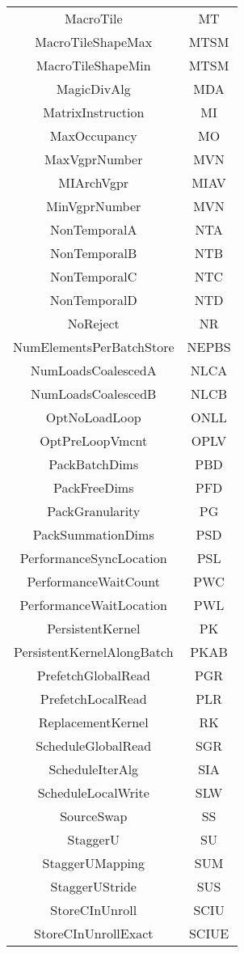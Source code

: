 \documentclass[]{article}
\begin{document}
\begin{center}
\begin{small}
\begin{longtable}{ |c|c| }
 MacroTile & MT \\
 MacroTileShapeMax & MTSM \\
 MacroTileShapeMin & MTSM \\
 MagicDivAlg & MDA \\
 MatrixInstruction & MI \\
 MaxOccupancy & MO \\
 MaxVgprNumber & MVN \\
 MIArchVgpr & MIAV \\
 MinVgprNumber & MVN \\
 NonTemporalA & NTA \\
 NonTemporalB & NTB \\
 NonTemporalC & NTC \\
 NonTemporalD & NTD \\
 NoReject & NR \\
 NumElementsPerBatchStore & NEPBS \\
 NumLoadsCoalescedA & NLCA \\
 NumLoadsCoalescedB & NLCB \\
 OptNoLoadLoop & ONLL \\
 OptPreLoopVmcnt & OPLV \\
 PackBatchDims & PBD \\
 PackFreeDims & PFD \\
 PackGranularity & PG \\
 PackSummationDims & PSD \\
 PerformanceSyncLocation & PSL \\
 PerformanceWaitCount & PWC \\
 PerformanceWaitLocation & PWL \\
 PersistentKernel & PK \\
 PersistentKernelAlongBatch & PKAB \\
 PrefetchGlobalRead & PGR \\
 PrefetchLocalRead & PLR \\
 ReplacementKernel & RK \\
 ScheduleGlobalRead & SGR \\
 ScheduleIterAlg & SIA \\
 ScheduleLocalWrite & SLW \\
 SourceSwap & SS \\
 StaggerU & SU \\
 StaggerUMapping & SUM \\
 StaggerUStride & SUS \\
 StoreCInUnroll & SCIU \\
 StoreCInUnrollExact & SCIUE \\

\end{longtable}
\end{small}
\end{center}
\end{document}
